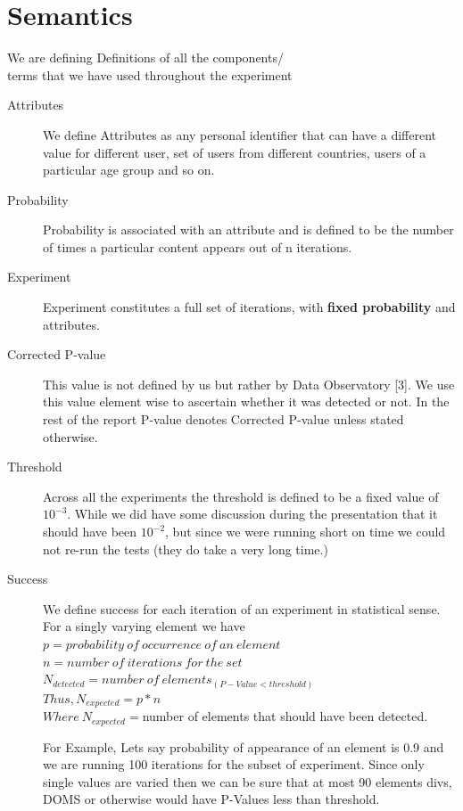\documentclass[fleqn,12pt]{SelfArx} %
\begin{document}
\section{Semantics}
We are defining Definitions of 	all the components/\\terms that we have used throughout the experiment
\begin{description}
\item[Attributes] We define Attributes as any personal identifier that can have a different value for different user, set of users from different countries, users of a particular age group and so on.
\item[Probability]
Probability is associated with an attribute and is defined to be the number of times a particular content appears out of n iterations.   
\item[Experiment]
Experiment constitutes a full set of iterations, with \textbf {fixed probability} and attributes. 
\item[Corrected P-value]
This value is not defined by us but rather by Data Observatory [3].  We use this value element wise to ascertain whether it was detected or not.  In the rest of the report P-value denotes Corrected P-value unless stated otherwise.
\item[Threshold]
Across all the experiments the threshold is defined to be a fixed value of $10^{-3}$. While we did have some discussion during the presentation that it should have been $10^{-2}$, but since we were running short on time we could not re-run the tests (they do take a very long time.)
\item[Success]
We define success for each iteration of an experiment in statistical sense. For a singly varying element we have \\
$p = probability\ of\ occurrence\ of\ an\ element$\\
$n = number\ of\ iterations\ for\ the\ set$\\
$N_{detected} = number\ of\ elements_{(P-Value<threshold)}$\\
$ Thus, N_{expected} = p * n$\\
$Where\ N_{expected} =$number of elements that should have been detected.\par
For Example, Lets say probability of appearance of an element is 0.9 and we are running 100 iterations for the subset of experiment. Since only single values are varied then we can be sure that at most 90 elements divs, DOMS or otherwise would have P-Values less than threshold.

\end{description}
\end{document}

